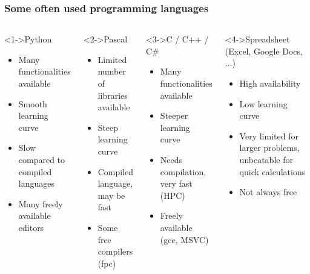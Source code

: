 \documentclass[11pt,table,final,fleqn,xcolor={usenames,dvipsnames},unknownkeysallowed,handout]{beamer}
\begin{document}
\begin{frame}
 \frametitle{Some often used programming languages}
 \fontsize{7.2pt}{7.2}\selectfont
 \begin{columns}[T]
   \begin{block}<1->{Python}
     \begin{itemize}
       \item Many functionalities available
       \item Smooth learning curve
       \item Slow compared to compiled languages
       \item Many freely available editors
     \end{itemize}
   \end{block}
    \begin{block}<2->{Pascal}
     \begin{itemize}
       \item Limited number of libraries available
       \item Steep learning curve
       \item Compiled language, may be fast
       \item Some free compilers (fpc)
     \end{itemize}
   \end{block}
   \begin{block}<3->{C / C++ / C\#}
     \begin{itemize}
       \item Many functionalities available 
       \item Steeper learning curve
       \item Needs compilation, very fast (HPC)
       \item Freely available (gcc, MSVC)
     \end{itemize}
   \end{block}
   \begin{block}<4->{Spreadsheet (Excel, Google Docs, ...)}
     \begin{itemize}
       \item High availability
       \item Low learning curve
       \item Very limited for larger problems, unbeatable for quick calculations
       \item Not always free
     \end{itemize}
   \end{block}
 \end{columns}

\end{frame}
\end{document}
